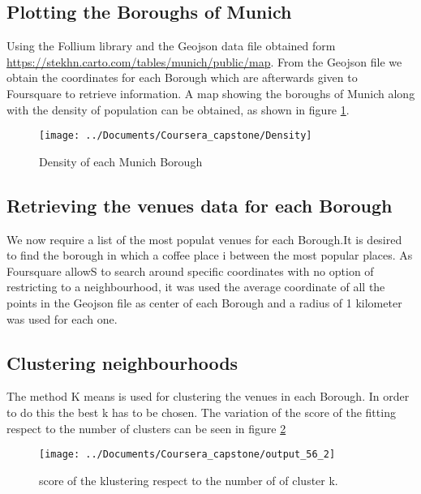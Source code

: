 \documentclass[]{report}
\begin{document}
\subsection*{Plotting the Boroughs of Munich}
	
Using the Follium library and the Geojson data file obtained form \url{https://stekhn.carto.com/tables/munich/public/map}. From the Geojson file we obtain the coordinates for each Borough which are afterwards given to Foursquare to retrieve information. A map showing the boroughs of Munich along with the density of population can be obtained, as shown in figure \ref{fig:munich_den_map}.

\begin{figure}[h!]
\centering
\texttt{[image: ../Documents/Coursera\_capstone/Density]}
\caption{Density of each Munich Borough}
\label{fig:munich_den_map}
\end{figure}

\subsection*{Retrieving the venues data for each Borough}

We now require a list of the most populat venues for each Borough.It is desired to find the borough in which a coffee place i between the most popular places.  As Foursquare allowS to search around specific coordinates with no option of restricting to a neighbourhood, it was used the average coordinate of all the points in the Geojson file as center of each Borough and a radius of 1 kilometer was used for each one.

	

 
\subsection*{Clustering neighbourhoods} 

The method K means is used for clustering the venues in each Borough. In order to do this the best k has to be chosen. The variation of the score of the fitting respect to the number of clusters can be seen in figure \ref{fig:output_56_2}

\begin{figure}[h!]
\centering
\texttt{[image: ../Documents/Coursera\_capstone/output\_56\_2]}
\caption{score of the klustering respect to the number of of cluster k.}
\label{fig:output_56_2}
\end{figure}
\end{document}
